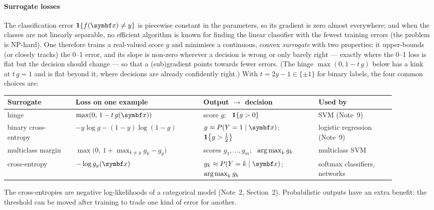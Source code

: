 \documentclass[11pt]{article}
\begin{document}
\paragraph{Surrogate losses} The classification error $\ind{f(\x) \ne y}$ is piecewise constant in the parameters,
so its gradient is zero almost everywhere; and when the classes are not linearly separable, no efficient algorithm is
known for finding the linear classifier with the fewest training errors (the problem is NP-hard). One therefore trains
a real-valued score $g$ and minimises a continuous, convex \emph{surrogate} with two properties: it upper-bounds (or
closely tracks) the 0--1 error, and its slope is non-zero wherever a decision is wrong or only barely right --- exactly
where the 0--1 loss is flat but the decision should change --- so that a (sub)gradient points towards fewer errors.
(The hinge $\max(0, 1 - t\,g)$ below has a kink at $t\,g = 1$ and is flat beyond it, where decisions are already confidently right.) With $t = 2y - 1 \in \{\pm 1\}$ for binary
labels, the four common choices are:

\begin{center}\small
\begin{tabular}{@{}L{0.16\linewidth}L{0.30\linewidth}L{0.27\linewidth}L{0.18\linewidth}@{}}
\toprule
Surrogate & Loss on one example & Output $\to$ decision & Used by \\
\midrule
hinge & $\max(0,\, 1 - t\,g(\x))$ & score $g$; \ $\mathbf{1}\!\left\{g > 0\right\}$ & SVM (Note~9) \\
binary cross-entropy & $-y\log g - (1-y)\log(1-g)$ & $g \approx P(Y = 1 \mid \x)$; \ $\mathbf{1}\!\left\{g > \tfrac12\right\}$ & logistic regression (Note~9) \\
multiclass margin & $\max\big(0,\, 1 + \max_{k \ne y} g_k - g_y\big)$ & scores $g_1, \dots, g_m$; \ $\operatorname*{arg\,max}_k g_k$ & multiclass SVM \\
cross-entropy & $-\log g_y(\x)$ & $g_k \approx P(Y = k \mid \x)$; \ $\operatorname*{arg\,max}_k g_k$ & softmax classifiers, networks \\
\bottomrule
\end{tabular}
\end{center}

The cross-entropies are negative log-likelihoods of a categorical model (Note~2, Section~2). Probabilistic outputs
have an extra benefit: the threshold can be moved after training to trade one kind of error for another.
\end{document}
